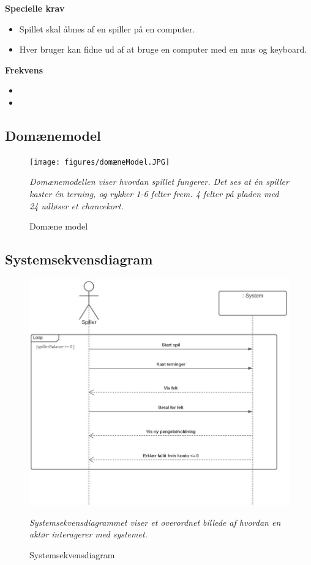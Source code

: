         \textbf{Specielle krav} 
        \begin{itemize}
            \item Spillet skal åbnes af en spiller på en computer.
            \item Hver bruger kan fidne ud af at bruge en computer med en mus og keyboard.
        \end{itemize}
        
        \textbf{Frekvens}
        \begin{itemize}
            \item 
            \item
            
        \end{itemize}
        
        
    \subsection{Domænemodel}
        \begin{figure}[H]
            \centering
            \texttt{[image: figures/domæneModel.JPG]}
            \caption{Domæne model}
            \emph{Domænemodellen viser hvordan spillet fungerer. Det ses at én spiller kaster én terning, og rykker 1-6 felter frem. 4 felter på pladen med 24 udløser et chancekort.}
        \end{figure}
    \subsection{Systemsekvensdiagram}
        \begin{figure}[H]
            \centering
            \includegraphics[width=14cm]{figures/overordnetSystemSekvensDiagram.JPG}
            \caption{Systemsekvensdiagram}
            \emph{Systemsekvensdiagrammet viser et overordnet billede af hvordan en aktør interagerer med systemet.}
        \end{figure}
      
        

        
    
    
    
